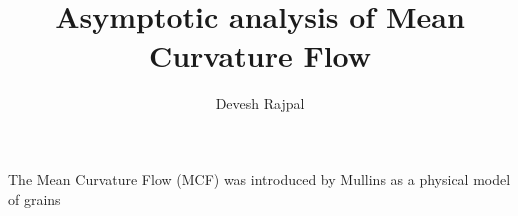 \documentclass{article}
\title{Asymptotic analysis of Mean Curvature Flow}
\author{Devesh Rajpal}
\date{}
\begin{document}
\maketitle
    The Mean Curvature Flow (MCF) was introduced by Mullins as a physical model of grains
\end{document}
